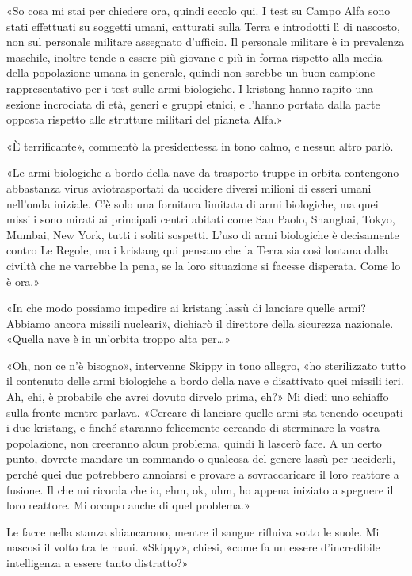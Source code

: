 «So cosa mi stai per chiedere ora, quindi eccolo qui. I test su Campo
Alfa sono stati effettuati su soggetti umani, catturati sulla Terra e
introdotti lì di nascosto, non sul personale militare assegnato
d'ufficio. Il personale militare è in prevalenza maschile, inoltre tende
a essere più giovane e più in forma rispetto alla media della
popolazione umana in generale, quindi non sarebbe un buon campione
rappresentativo per i test sulle armi biologiche. I kristang hanno
rapito una sezione incrociata di età, generi e gruppi etnici, e l'hanno
portata dalla parte opposta rispetto alle strutture militari del pianeta
Alfa.»

«È terrificante», commentò la presidentessa in tono calmo, e nessun
altro parlò.

«Le armi biologiche a bordo della nave da trasporto truppe in orbita
contengono abbastanza virus aviotrasportati da uccidere diversi milioni
di esseri umani nell'onda iniziale. C'è solo una fornitura limitata di
armi biologiche, ma quei missili sono mirati ai principali centri
abitati come San Paolo, Shanghai, Tokyo, Mumbai, New York, tutti i
soliti sospetti. L'uso di armi biologiche è decisamente contro Le
Regole, ma i kristang qui pensano che la Terra sia così lontana dalla
civiltà che ne varrebbe la pena, se la loro situazione si facesse
disperata. Come lo è ora.»

«In che modo possiamo impedire ai kristang lassù di lanciare quelle
armi? Abbiamo ancora missili nucleari», dichiarò il direttore della
sicurezza nazionale. «Quella nave è in un'orbita troppo alta per\ldots»

«Oh, non ce n'è bisogno», intervenne Skippy in tono allegro, «ho
sterilizzato tutto il contenuto delle armi biologiche a bordo della nave
e disattivato quei missili ieri. Ah, ehi, è probabile che avrei dovuto
dirvelo prima, eh?» Mi diedi uno schiaffo sulla fronte mentre parlava.
«Cercare di lanciare quelle armi sta tenendo occupati i due kristang, e
finché staranno felicemente cercando di sterminare la vostra
popolazione, non creeranno alcun problema, quindi li lascerò fare. A un
certo punto, dovrete mandare un commando o qualcosa del genere lassù per
ucciderli, perché quei due potrebbero annoiarsi e provare a
sovraccaricare il loro reattore a fusione. Il che mi ricorda che io,
ehm, ok, uhm, ho appena iniziato a spegnere il loro reattore. Mi occupo
anche di quel problema.»

Le facce nella stanza sbiancarono, mentre il sangue rifluiva sotto le
suole. Mi nascosi il volto tra le mani. «Skippy», chiesi, «come fa un
essere d'incredibile intelligenza a essere tanto distratto?»

